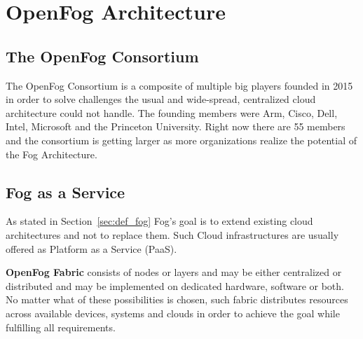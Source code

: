\section{OpenFog Architecture}

\subsection{The OpenFog Consortium}

The OpenFog Consortium is a composite of multiple big players founded in 2015 in order to solve challenges the usual and wide-spread, centralized cloud architecture could not handle.
The founding members were Arm, Cisco, Dell, Intel, Microsoft and the Princeton University. Right now there are 55 members and the consortium is getting larger as more organizations realize the potential of the Fog Architecture.

\subsection{Fog as a Service}



As stated in Section~\ref{sec:def_fog} Fog's goal is to extend existing cloud architectures and not to replace them. Such Cloud infrastructures are usually offered as Platform as a Service (PaaS).




\textbf{OpenFog Fabric} consists of nodes or layers and may be either centralized or distributed and may be implemented on dedicated hardware, software or both. No matter what of these possibilities is chosen, such fabric distributes resources across available devices, systems and clouds in order to achieve the goal while fulfilling all requirements.\cite[p. 7]{OpenFog}

